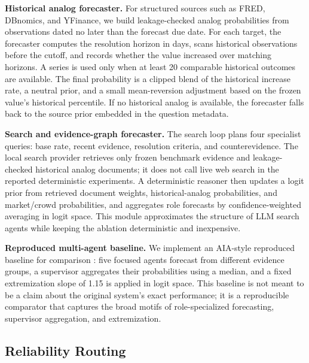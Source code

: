 \documentclass{article}
\begin{document}
\textbf{Historical analog forecaster.} For structured sources such as FRED, DBnomics, and YFinance, we build leakage-checked analog probabilities from observations dated no later than the forecast due date. For each target, the forecaster computes the resolution horizon in days, scans historical observations before the cutoff, and records whether the value increased over matching horizons. A series is used only when at least 20 comparable historical outcomes are available. The final probability is a clipped blend of the historical increase rate, a neutral prior, and a small mean-reversion adjustment based on the frozen value's historical percentile. If no historical analog is available, the forecaster falls back to the source prior embedded in the question metadata.

\textbf{Search and evidence-graph forecaster.} The search loop plans four specialist queries: base rate, recent evidence, resolution criteria, and counterevidence. The local search provider retrieves only frozen benchmark evidence and leakage-checked historical analog documents; it does not call live web search in the reported deterministic experiments. A deterministic reasoner then updates a logit prior from retrieved document weights, historical-analog probabilities, and market/crowd probabilities, and aggregates role forecasts by confidence-weighted averaging in logit space. This module approximates the structure of LLM search agents while keeping the ablation deterministic and inexpensive.

\textbf{Reproduced multi-agent baseline.} We implement an AIA-style reproduced baseline for comparison \citep{alur2025aia}: five focused agents forecast from different evidence groups, a supervisor aggregates their probabilities using a median, and a fixed extremization slope of 1.15 is applied in logit space. This baseline is not meant to be a claim about the original system's exact performance; it is a reproducible comparator that captures the broad motifs of role-specialized forecasting, supervisor aggregation, and extremization.

\subsection{Reliability Routing}
\end{document}
